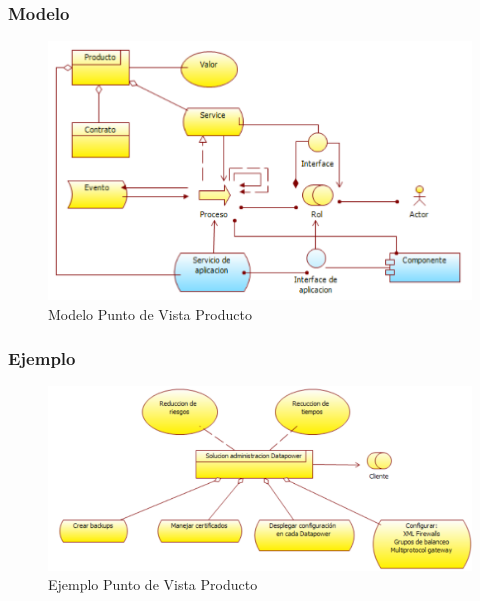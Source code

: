 \subsubsection{Modelo}
    \begin{figure}[th!]
        \centering
        \includegraphics[width=1.0\textwidth]{Arquitectura/images/modelo/Punto_de_vista_Producto.pdf}
        \caption{Modelo Punto de Vista Producto}
    \end{figure}
\newpage
\subsubsection{Ejemplo}
    \begin{figure}[th!]
        \centering
        \includegraphics[width=1.0\textwidth]{Arquitectura/images/Punto_de_vista_Producto.pdf}
        \caption{Ejemplo Punto de Vista Producto}
    \end{figure}
\newpage
